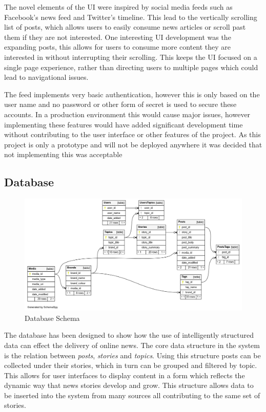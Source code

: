 \documentclass[12pt,titlepage]{article}
\begin{document}
  The novel elements of the UI were inspired by social media feeds such as
  Facebook's news feed and Twitter's timeline. This lead to the vertically
  scrolling list of posts, which allows users to easily consume news articles or
  scroll past them if they are not interested. One interesting UI development
  was the expanding posts, this allows for users to consume more content they
  are interested in without interrupting their scrolling. This keeps the UI
  focused on a single page experience, rather than directing users to multiple
  pages which could lead to navigational issues.

  The feed implements very basic authentication, however this is only based on
  the user name and no password or other form of secret is used to secure these
  accounts. In a production environment this would cause major issues, however
  implementing these features would have added significant development time
  without contributing to the user interface or other features of the project.
  As this project is only a prototype and will not be deployed anywhere it was
  decided that not implementing this was acceptable

  \subsection{Database}

  \begin{figure}[ht]
    \centering
    \includegraphics[width=\textwidth]{../img/dbschema.png}
    \caption{Database Schema}
    \label{fig:schema}
  \end{figure}

  The database has been designed to show how the use of intelligently structured
  data can effect the delivery of online news. The core data structure in the
  system is the relation between \textit{posts}, \textit{stories} and
  \textit{topics}. Using this structure posts can be collected under their
  stories, which in turn can be grouped and filtered by topic. This allows for
  user interfaces to display content in a form which reflects the dynamic way
  that news stories develop and grow. This structure allows data to be inserted
  into the system from many sources all contributing to the same set of stories.
\end{document}
